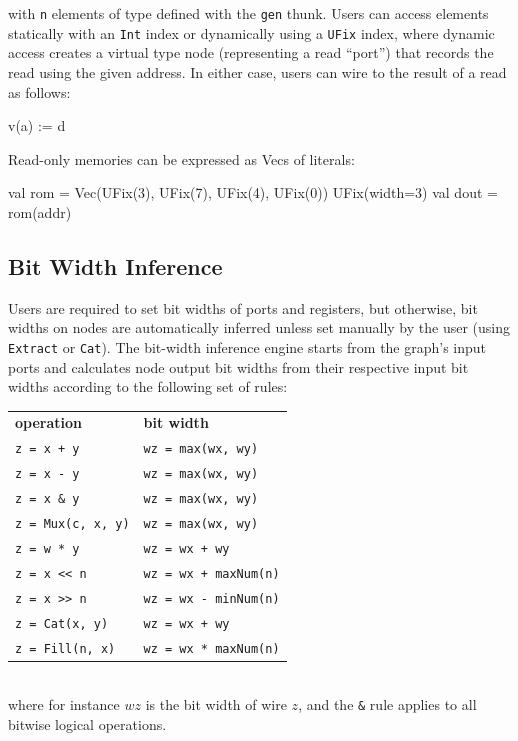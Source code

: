 \documentclass[10pt,twocolumn]{article}
\def\code#1{{\small\tt #1}}
\begin{document}
\noindent
with \code{n} elements of type defined with the \code{gen} thunk.
Users can access elements statically with an \code{Int} index or
dynamically using a \code{UFix} index, 
where dynamic access creates a virtual type node (representing a read
``port'') that records the read using the given address.  In either case,
users can wire to the result of a read as follows:

\begin{scala}
v(a) := d
\end{scala}

Read-only memories can be expressed as Vecs of literals:

\begin{scala}
val rom = Vec(UFix(3), UFix(7), UFix(4), UFix(0)) { UFix(width=3) }
val dout = rom(addr)
\end{scala}


\subsection{Bit Width Inference}

Users are required to set bit widths of ports and registers, but otherwise,
bit widths on nodes are automatically inferred unless set manually by
the user (using \code{Extract} or \code{Cat}).
The bit-width inference engine starts from the graph's input ports and 
calculates node output bit widths from their respective input bit widths according to the following set of rules:\\[-2mm]

{\small
\begin{tabular}{ll}
{\bf operation} & {\bf bit width} \\ 
\verb|z = x + y| & \verb+wz = max(wx, wy)+ \\
\verb+z = x - y+ & \verb+wz = max(wx, wy)+\\
\verb+z = x & y+ & \verb+wz = max(wx, wy)+ \\
\verb+z = Mux(c, x, y)+ & \verb+wz = max(wx, wy)+ \\
\verb+z = w * y+ & \verb!wz = wx + wy! \\
\verb+z = x << n+ & \verb!wz = wx + maxNum(n)! \\
\verb+z = x >> n+ & \verb+wz = wx - minNum(n)+ \\
\verb+z = Cat(x, y)+ & \verb!wz = wx + wy! \\
\verb+z = Fill(n, x)+ & \verb+wz = wx * maxNum(n)+ \\
\end{tabular}
}
\\[1mm]
\noindent  
where for instance $wz$ is the bit width of wire $z$, and the \verb+&+
rule applies to all bitwise logical operations.
\end{document}
